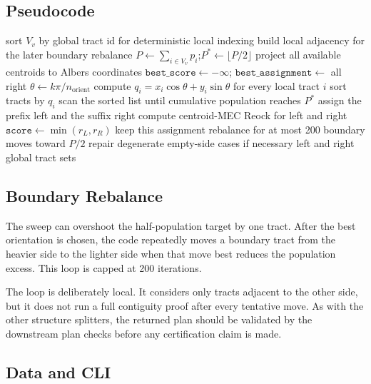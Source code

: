 \subsection{Pseudocode}

\begin{algorithm}[t]
\caption{\mka{}-\textsc{Bisect}($G_v$, $\mathbf{x}$, $\mathbf{p}$,
  $n_{\mathrm{orient}}$, $\tau$)}
\label{alg:mka}
\begin{algorithmic}[1]
\State sort $V_v$ by global tract id for deterministic local indexing
\State build local adjacency for the later boundary rebalance
\State $P \gets \sum_{i\in V_v}p_i$;\quad $P^* \gets \lfloor P/2\rfloor$
\State project all available centroids to Albers coordinates
\State $\mathtt{best\_score}\gets-\infty$;\quad
       $\mathtt{best\_assignment}\gets$ all right
  \State $\theta\gets k\pi/n_{\mathrm{orient}}$
  \State compute $q_i=x_i\cos\theta+y_i\sin\theta$ for every local tract $i$
  \State sort tracts by $q_i$
  \State scan the sorted list until cumulative population reaches $P^*$
  \State assign the prefix left and the suffix right
  \State compute centroid-MEC Reock for left and right
  \State $\mathtt{score}\gets\min(r_L,r_R)$
    \State keep this assignment
  \EndIf
\EndFor
\State rebalance for at most 200 boundary moves toward $P/2$
\State repair degenerate empty-side cases if necessary
\State \Return left and right global tract sets
\end{algorithmic}
\end{algorithm}

\subsection{Boundary Rebalance}

The sweep can overshoot the half-population target by one tract. After the best
orientation is chosen, the code repeatedly moves a boundary tract from the
heavier side to the lighter side when that move best reduces the population
excess. This loop is capped at 200 iterations.

The loop is deliberately local. It considers only tracts adjacent to the other
side, but it does not run a full contiguity proof after every tentative move.
As with the other structure splitters, the returned plan should be validated by
the downstream plan checks before any certification claim is made.

\subsection{Data and CLI}
\label{subsec:data}

